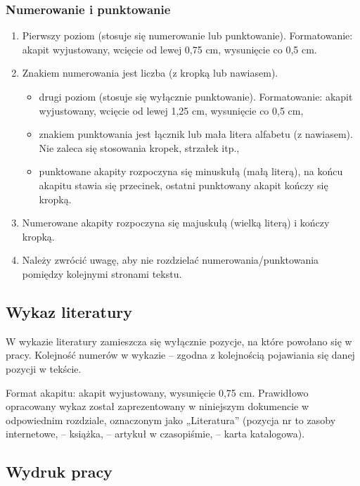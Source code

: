 \documentclass[12pt,twoside]{mwart}
\begin{document}
\subsubsection{Numerowanie i punktowanie}

\begin{enumerate}[label=\arabic*), leftmargin=1.25cm]
	\item Pierwszy poziom (stosuje się numerowanie lub punktowanie). Formatowanie:
	akapit wyjustowany, wcięcie od lewej 0,75 cm, wysunięcie co 0,5 cm.
	\item Znakiem numerowania jest liczba (z kropką lub nawiasem).
		\begin{itemize}[label=-,labelsep=0.4cm,leftmargin=0.6cm]
			\item drugi poziom (stosuje się wyłącznie punktowanie). Formatowanie: akapit
			wyjustowany, wcięcie od lewej 1,25 cm, wysunięcie co 0,5 cm,
			\item znakiem punktowania jest łącznik lub mała litera alfabetu (z nawiasem). Nie
			zaleca się stosowania kropek, strzałek itp.,
			\item punktowane akapity rozpoczyna się minuskułą (małą literą), na końcu akapitu
			stawia się przecinek, ostatni punktowany akapit kończy się kropką.
		\end{itemize}
	\item Numerowane akapity rozpoczyna się majuskułą (wielką literą) i kończy kropką.
	\item Należy zwrócić uwagę, aby nie rozdzielać numerowania/punktowania pomiędzy
	kolejnymi stronami tekstu.
\end{enumerate}


\subsection{Wykaz literatury}

W wykazie literatury zamieszcza się wyłącznie pozycje, na które powołano się
w pracy. Kolejność numerów w wykazie – zgodna z kolejnością pojawiania się danej
pozycji w tekście.

Format akapitu: akapit wyjustowany, wysunięcie 0,75 cm. Prawidłowo opracowany
wykaz został zaprezentowany w niniejszym dokumencie w odpowiednim rozdziale, oznaczonym jako „Literatura”  (pozycja nr \cite{str} to zasoby internetowe,
\cite{Jakubczyk1997} – książka, \cite{Barski2011} – artykuł w czasopiśmie, \cite{dokum} – karta katalogowa).

{\subsection{Wydruk pracy}}
\end{document}
